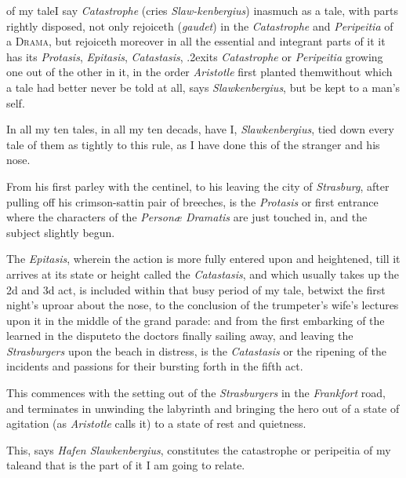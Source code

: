 \documentclass{article}
\begin{document}
\noindent
{}
of my tale\tsk I say \textit{Catastrophe} (cries
\textit{Slaw-\break kenbergius}) inasmuch as a
tale, with parts rightly disposed, not only rejoiceth
(\textit{gau\-det}) in the \textit{Catastrophe} and
\textit{Peripeitia} of\break
a \textsc{Drama}, but rejoiceth moreover in all the essential
and integrant parts of it\tsh\break
it has its \textit{Protasis}, \textit{Epitasis}, \textit{Catastasis},\break
\lower.2ex\hbox{i}\sic ts \textit{Catastrophe} or
\textit{Peripeitia} growing one out of the other in it, in the order
\textit{Aristotle} first planted them\tsh without which a
tale had better never be told at all, says\break
\textit{Slawkenbergius}, but be kept to a man’s\break
self.

In all my ten tales, in all my ten de\-cads, have I,
\textit{Slawkenbergius}, tied down every tale of them as
tightly to this rule, as I have done this of the stranger and\break
his nose.

\tsk From his first parley with the centi\-nel, to his
leaving the city of \textit{Strasburg}, after pulling off his
crimson-sattin pair of breeches, is the \textit{Protasis} or first
entrance\break
\tsk where the characters of the \textit{Personæ
Dramatis} are just touched in, and the subject slightly
begun.

The \textit{Epitasis}, wherein the action is\break
more fully entered upon and heightened,\break
till it arrives at its state or height called
the \textit{Catastasis}, and which usually takes up the 2d and 3d
act, is included within that busy period of my tale, betwixt the
first night’s uproar about the nose, to the conclusion of the
trumpeter’s wife’s lectures upon it in the middle of
the grand parade: and from the first embarking of the learned in
the dispute\tsk to the doctors finally sailing away, and leaving
the \textit{Strasburgers} upon the beach in distress, is the
\textit{Catastasis} or the ripening of the incidents and passions for their bursting
forth in the fifth act.

This commences with the setting out of the \textit{Strasburgers}
in the \textit{Frankfort} road, and terminates in unwinding the
laby\-rinth and bringing the hero out of a state of agitation (as
\textit{Aristotle} calls it) to a state of rest and quietness.

This, says \textit{Hafen Slawkenbergius}, constitutes the
catastrophe or peripeitia of my tale\tsk and that
is the part of it I am going to relate.
\end{document}

